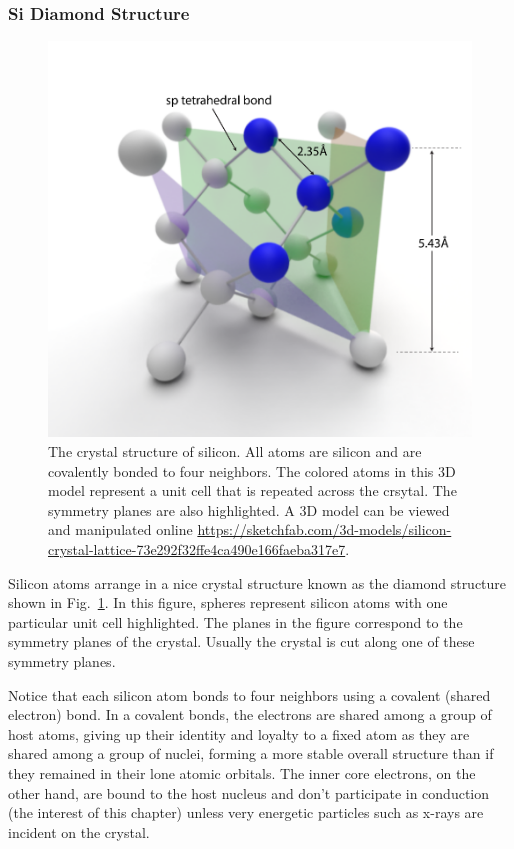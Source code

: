 \subsubsection{Si Diamond Structure}




\begin{figure}
\begin{center}
\includegraphics[width=.75\columnwidth]{silicon_crysal_label.pdf}
\end{center}
\caption{The crystal structure of silicon.  All atoms are silicon and are covalently bonded to four neighbors.  The colored atoms in this 3D model represent a unit cell that is repeated across the crsytal.  The symmetry planes are also highlighted.  A 3D model can be viewed and manipulated online \url{https://sketchfab.com/3d-models/silicon-crystal-lattice-73e292f32ffe4ca490e166faeba317e7}.  } \label{fig:silicon_crysal}
\end{figure}


Silicon atoms arrange in a nice crystal structure known as the diamond structure shown in Fig.~\ref{fig:silicon_crysal}.  In this figure, spheres represent silicon atoms with one particular unit cell highlighted.  The planes in the figure correspond to the symmetry planes of the crystal.  Usually the crystal is cut along one of these symmetry planes.


Notice that each silicon atom bonds to four neighbors using a covalent (shared electron) bond.  In a covalent bonds, the electrons are shared among a group of host atoms, giving up their identity and loyalty to a fixed atom as they are shared among a group of nuclei, forming a more stable overall structure than if they remained in their lone atomic orbitals.  The inner core electrons, on the other hand, are bound to the host nucleus and don't participate in conduction (the interest of this chapter) unless very energetic particles such as x-rays are incident on the crystal. 






